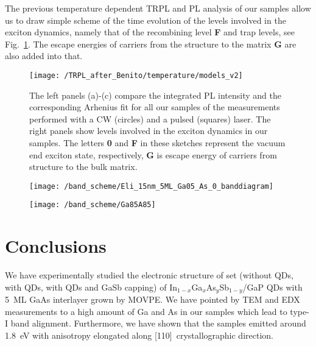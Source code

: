 The previous temperature dependent TRPL and PL analysis of our samples allow us to draw simple scheme of the time evolution of the levels involved in the exciton dynamics, namely that of the recombining level \textbf{F} and trap levels, see Fig.~\ref{fig:Arrhenius_PLandTRPL}. The escape energies of carriers from the structure to the matrix \textbf{G} are also added into that. 




\begin{figure}
	\centering
	\texttt{[image: /TRPL\_after\_Benito/temperature/models\_v2]} %
	\caption{The left panels (a)-(c) compare the integrated PL intensity and the corresponding Arhenius fit for all our samples of the measurements performed with a CW (circles) and a pulsed (squares) laser. The right panels show levels involved in the exciton dynamics in our samples. The letters \textbf{0} and \textbf{F} in these sketches represent the vacuum end exciton state, respectively, \textbf{G} is escape energy of carriers from structure to the bulk matrix.}
	\label{fig:Arrhenius_PLandTRPL}
\end{figure}
\newpage 


\begin{figure}
	\centering
	\texttt{[image: /band\_scheme/Eli\_15nm\_5ML\_Ga05\_As\_0\_banddiagram]} %
	\caption{}
	\label{fig:Band_scheme_wo}
\end{figure}


\begin{figure}
	\centering
	\texttt{[image: /band\_scheme/Ga85A85]}%
	\caption{}
	\label{fig:Band_scheme_cap}
\end{figure}

\section{Conclusions}
We have experimentally studied the electronic structure of set (without QDs, with QDs, with QDs and GaSb capping) of In$_{1-x}$Ga$_{x}$As$_y$Sb$_{1-y}$/GaP QDs with 5~ML GaAs interlayer grown by MOVPE. We have pointed by TEM and EDX measurements to a high amount of Ga and As in our samples which lead to type-I band alignment. Furthermore, we have shown that the samples emitted around 1.8~eV with anisotropy elongated along [110]~crystallographic direction.   %

{\color{green}{Podívej se i zpět do textu, přibyly tam modre podbarvene texty
	
	Zmínit, že se povedlo narůst 5ML GaAs vrstvu}} {\color{red}{CO DÁL???}}